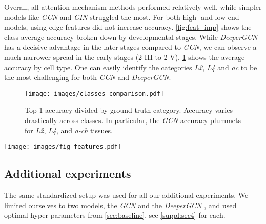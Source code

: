 \documentclass[10pt,twocolumn,letterpaper]{article}
\begin{document}
Overall, all attention mechanism methods performed relatively well, while simpler models like \textit{GCN} and \textit{GIN} struggled the most.
For both high- and low-end models, using edge features did not increase accuracy.
\cref{fig:feat_imp} shows the class-average accuracy broken down by developmental stages. While \textit{DeeperGCN} has a decisive advantage in the later stages compared to \textit{GCN}, we can observe a much narrower spread in the early stages (2-III to 2-V).
\cref{fig:classes_accuracy} shows the average accuracy by cell type. One can easily identify the categories \textit{L2}, \textit{L4} and \textit{ac} to be the most challenging for both \textit{GCN} and \textit{DeeperGCN}.

\begin{figure}
    \centering
    \texttt{[image: images/classes\_comparison.pdf]}
  \caption{Top-1 accuracy divided by ground truth category. Accuracy varies drastically across classes. In particular, the \textit{GCN} accuracy plummets for \textit{L2}, \textit{L4}, and \textit{a-ch} tissues.}
  \label{fig:classes_accuracy}
\end{figure}

\begin{figure*}[t!]
  \centering
   \texttt{[image: images/fig\_features.pdf]}
    \caption{Comparison of the class average accuracy for four different feature sets. As one would expect, using all features consistently achieves the highest accuracy. Interestingly, one can observe that the covariant features mostly contribute to accuracy in the early stages (2-III to 2-V). In the later stages (3-I to 3-VI), the invariant features are the major contributors to the overall accuracy. Lastly, even when using only the local degree profile of a node as its feature, the networks are still able to make better than random predictions on the task.}
  \label{fig:feat_imp}
\end{figure*}

\subsection{Additional experiments}
\label{additiona_exp}
The same standardized setup was used for all our additional experiments. We limited ourselves to two models, the \textit{GCN} \cite{kipf2016semi} and the \textit{DeeperGCN} \cite{li2020deepergcn}, and used optimal hyper-parameters from \cref{sec:baseline}, see \cref{suppl:sec4} for each.
\end{document}
